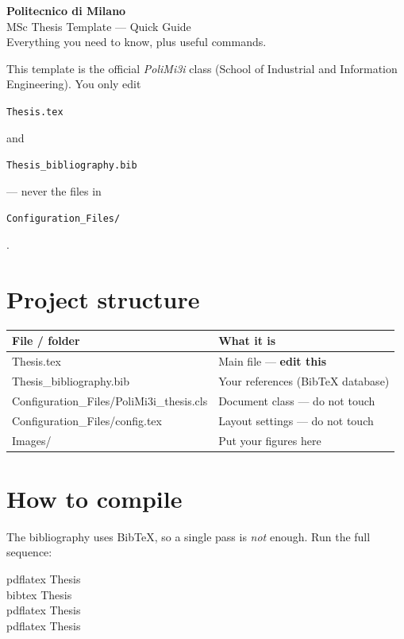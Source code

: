\documentclass[11pt]{article}
\newcommand{\code}[1]{%
  \colorbox{codebg}{\rule[-0.2em]{0pt}{1em}\texttt{\small #1}}}
\begin{document}
\thispagestyle{empty}

\begin{tcolorbox}[enhanced,colback=poliblue,colframe=poliblue,
  arc=4pt,boxrule=0pt,left=18pt,right=18pt,top=16pt,bottom=16pt]
  {\color{white}\Huge\bfseries Politecnico di Milano}\\[4pt]
  {\color{polilight}\LARGE MSc Thesis Template --- Quick Guide}\\[10pt]
  {\color{white}\normalsize Everything you need to know, plus useful commands.}
\end{tcolorbox}

\vspace{4pt}
{\color{soft}\small This template is the official \emph{PoliMi3i} class
(School of Industrial and Information Engineering). You only edit
\code{Thesis.tex} and \code{Thesis\_bibliography.bib} --- never the files in
\code{Configuration\_Files/}.}

\section{Project structure}

\begin{tabular}{@{}>{\ttfamily}l l@{}}
\toprule
\normalfont\textbf{File / folder} & \textbf{What it is} \\
\midrule
Thesis.tex                & Main file --- \textbf{edit this} \\
Thesis\_bibliography.bib  & Your references (BibTeX database) \\
Configuration\_Files/PoliMi3i\_thesis.cls & Document class --- do not touch \\
Configuration\_Files/config.tex & Layout settings --- do not touch \\
Images/                   & Put your figures here \\
\bottomrule
\end{tabular}

\section{How to compile}

The bibliography uses BibTeX, so a single pass is \emph{not} enough. Run the
full sequence:

\begin{cmd}
pdflatex Thesis\\
bibtex   Thesis\\
pdflatex Thesis\\
pdflatex Thesis
\end{cmd}
\end{document}
